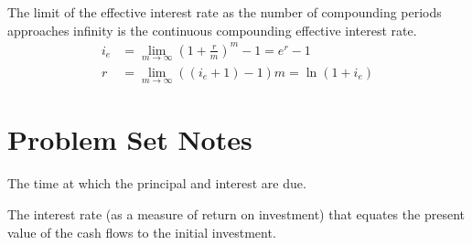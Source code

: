 \begin{corollary}
    The limit of the effective interest rate as the number of compounding periods approaches infinity is the continuous compounding effective interest rate.
    \begin{align}
        i_e & = \lim_{m \to \infty} (1 + \frac{r}{m})^m - 1 = e^r - 1 \\
        r   & = \lim_{m \to \infty} ((i_e + 1) - 1)m = \ln(1 + i_e)
    \end{align}
\end{corollary}

\section{Problem Set Notes}
\begin{vocabulary}
    [Maturity]
    The time at which the principal and interest are due.
\end{vocabulary}
\begin{vocabulary}
    The interest rate (as a measure of return on investment) that equates the present value of the cash flows to the initial investment.
\end{vocabulary}